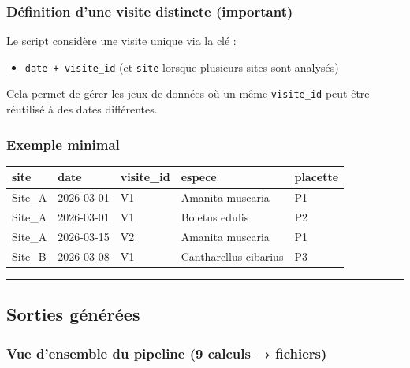 \subsubsection{Définition d'une visite distincte
(important)}\label{duxe9finition-dune-visite-distincte-important}

Le script considère une visite unique via la clé :

\begin{itemize}
\tightlist
\item
  \texttt{date\ +\ visite\_id} (et \texttt{site} lorsque plusieurs sites
  sont analysés)
\end{itemize}

Cela permet de gérer les jeux de données où un même \texttt{visite\_id}
peut être réutilisé à des dates différentes.

\subsubsection{Exemple minimal}\label{exemple-minimal}

{\def\LTcaptype{none} %
\begin{longtable}[]{@{}lllll@{}}
\toprule\noalign{}
site & date & visite\_id & espece & placette \\
\midrule\noalign{}
\endhead
\bottomrule\noalign{}
\endlastfoot
Site\_A & 2026-03-01 & V1 & Amanita muscaria & P1 \\
Site\_A & 2026-03-01 & V1 & Boletus edulis & P2 \\
Site\_A & 2026-03-15 & V2 & Amanita muscaria & P1 \\
Site\_B & 2026-03-08 & V1 & Cantharellus cibarius & P3 \\
\end{longtable}
}

\begin{center}\rule{0.5\linewidth}{0.5pt}\end{center}

\subsection{Sorties générées}\label{sorties-guxe9nuxe9ruxe9es}

\subsubsection{Vue d'ensemble du pipeline (9 calculs →
fichiers)}\label{vue-densemble-du-pipeline-9-calculs-fichiers}

